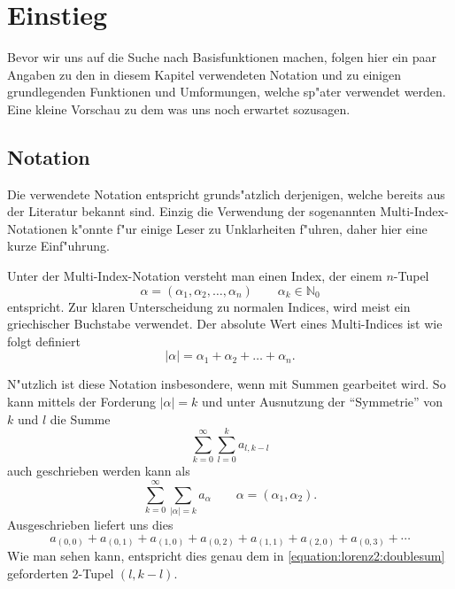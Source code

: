 \section{Einstieg\label{section:lorenz2:einstieg}}

Bevor wir uns auf die Suche nach Basisfunktionen machen, folgen hier ein paar 
Angaben zu den in diesem Kapitel verwendeten Notation und zu einigen 
grundlegenden Funktionen und Umformungen, welche sp"ater verwendet werden. Eine 
kleine Vorschau zu dem was uns noch erwartet sozusagen.

\subsection{Notation}
Die verwendete Notation entspricht grunds"atzlich derjenigen, welche 
bereits aus der Literatur bekannt sind. Einzig die Verwendung der 
sogenannten Multi-Index-Notationen k"onnte f"ur einige Leser zu Unklarheiten 
f"uhren, daher hier eine kurze Einf"uhrung.

Unter der Multi-Index-Notation versteht man einen Index, der einem 
$n$-Tupel
\begin{equation*}
	\alpha = (\alpha_1, \alpha_2, \dotsc, \alpha_n) \qquad \alpha_k \in 
	\mathbb{N}_{0}
\end{equation*}
entspricht. Zur klaren Unterscheidung zu normalen Indices, wird meist ein 
griechischer Buchstabe verwendet. Der absolute Wert eines Multi-Indices ist wie 
folgt definiert
\begin{equation*}
	|\alpha| = \alpha_1 + \alpha_2 + \dots + \alpha_n.
\end{equation*}
 
N"utzlich ist diese Notation insbesondere, wenn mit Summen gearbeitet wird. So 
kann mittels der Forderung $|\alpha| = k$ und unter Ausnutzung der 
``Symmetrie'' von $k$ und $l$ die Summe
\begin{equation}
	\sum_{k = 0}^{\infty}\sum_{l = 0}^{k}a_{l, k - l}
	\label{equation:lorenz2:doublesum}
\end{equation}
auch geschrieben werden kann als
\begin{equation*}
	\sum_{k = 0}^{\infty}\sum_{|\alpha| = k}a_{\alpha}
	\qquad \alpha = (\alpha_1, \alpha_2).
\end{equation*}
Ausgeschrieben liefert uns dies
\begin{equation*}
	a_{(0,0)} + a_{(0,1)} + a_{(1,0)} + a_{(0,2)} + a_{(1,1)} + a_{(2,0)} + 
	a_{(0,3)} + 
	\dotsb
\end{equation*}
Wie man sehen kann, entspricht dies genau dem in 
\cref{equation:lorenz2:doublesum} geforderten $2$-Tupel $(l, k - l)$.

